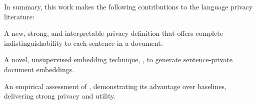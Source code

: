 In summary, this work makes the following contributions to the language privacy literature:

\begin{squishlist}
	\item A new, strong, and interpretable privacy definition that offers complete indistinguishability to each sentence in a document. 
	\item A novel, unsupervised embedding technique, \technique, to generate sentence-private document embeddings. 
	\item An empirical assessment of \technique, demonstrating its advantage over baselines, delivering strong privacy and utility. 
\end{squishlist}